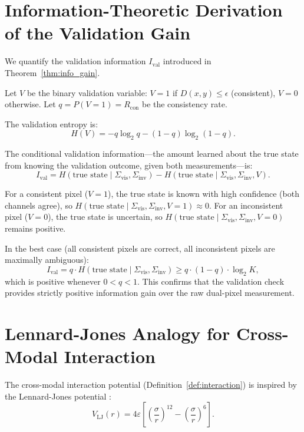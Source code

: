 \documentclass[11pt,twocolumn,a4paper]{article}
\newcommand{\Sigvis}{\Sigma_{\mathrm{vis}}}
\newcommand{\Siginv}{\Sigma_{\mathrm{inv}}}
\begin{document}
\section{Information-Theoretic Derivation of the Validation Gain}\label{app:validation}

We quantify the validation information $I_{\mathrm{val}}$ introduced in Theorem~\ref{thm:info_gain}.

Let $V$ be the binary validation variable: $V = 1$ if $D(x,y) \leq \epsilon$ (consistent), $V = 0$ otherwise.
Let $q = P(V = 1) = R_{\mathrm{con}}$ be the consistency rate.

The validation entropy is:
\begin{equation}
H(V) = -q\log_2 q - (1-q)\log_2(1-q).
\end{equation}

The conditional validation information---the amount learned about the true state from knowing the validation outcome, given both measurements---is:
\begin{equation}
I_{\mathrm{val}} = H(\text{true state} \mid \Sigvis, \Siginv) - H(\text{true state} \mid \Sigvis, \Siginv, V).
\end{equation}

For a consistent pixel ($V = 1$), the true state is known with high confidence (both channels agree), so $H(\text{true state} \mid \Sigvis, \Siginv, V=1) \approx 0$.
For an inconsistent pixel ($V = 0$), the true state is uncertain, so $H(\text{true state} \mid \Sigvis, \Siginv, V=0)$ remains positive.

In the best case (all consistent pixels are correct, all inconsistent pixels are maximally ambiguous):
\begin{equation}
I_{\mathrm{val}} = q \cdot H(\text{true state} \mid \Sigvis, \Siginv) \geq q \cdot (1 - q) \cdot \log_2 K,
\end{equation}
which is positive whenever $0 < q < 1$.
This confirms that the validation check provides strictly positive information gain over the raw dual-pixel measurement.


\section{Lennard-Jones Analogy for Cross-Modal Interaction}\label{app:lj}

The cross-modal interaction potential (Definition~\ref{def:interaction}) is inspired by the Lennard-Jones potential \citep{Jones1924}:
\begin{equation}
V_{\mathrm{LJ}}(r) = 4\varepsilon\left[\left(\frac{\sigma}{r}\right)^{12} - \left(\frac{\sigma}{r}\right)^6\right].
\end{equation}
\end{document}
